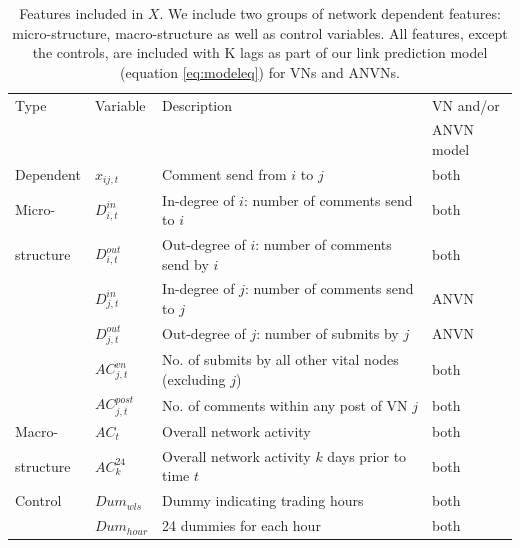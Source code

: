 \begin{table} 
	\caption{Features included in $X$. We include two groups of network dependent features: micro-structure, macro-structure as well as control variables. All features, except the controls, are included with K lags as part of our link prediction model (equation \ref{eq:modeleq}) for VNs and ANVNs.}
	\label{tab:features_fol}
	\centering
	\begin{tabular}[t]{llll}
		\hline \hline
		Type&Variable & Description  &VN and/or \\
		&&&ANVN model\\
		\hline \hline
		Dependent&$x_{ij,t}$& Comment send from $i$ to $j$  &both\\
		\hline
		Micro-&$D^{in}_{i,t}$ &In-degree of $i$: number of comments send to $i$   &both \\		
		structure&$D^{out}_{i,t}$ &Out-degree of $i$: number of comments send by $i$  & both \\		
		&$D^{in}_{j,t}$ &In-degree of $j$: number of comments send to $j$   &ANVN \\		
		&$D^{out}_{j,t}$ &Out-degree of $j$: number of submits by $j$   &ANVN \\		
		&$AC^{vn}_{j,t}$ &No. of submits by all other vital nodes (excluding $j$)   &both \\		
		&$AC^{post}_{j,t}$ &No. of comments within any post of VN $j$  &both \\		
		\hline
		Macro-&$AC_t$ & Overall network activity  &both \\
		structure&$AC^{24}_k$ &  Overall network activity $k$ days prior to time $t$ &both \\
		\hline		Control&$Dum_{wls}$  & Dummy indicating trading hours &both\\
		&$Dum_{hour}$ & 24 dummies for each hour &both \\
		\hline \hline
	\end{tabular}
\end{table}

